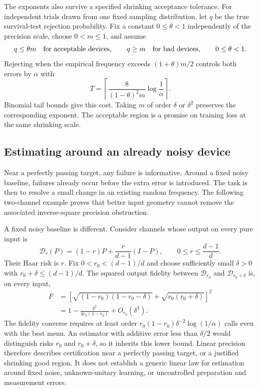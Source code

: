 \documentclass[11pt,a4paper]{article}
\numberwithin{equation}{section}
\begin{document}
The exponents also survive a specified shrinking acceptance tolerance. For independent trials drawn from one fixed sampling distribution, let $q$ be the true survival-test rejection probability. Fix a constant $0\le\theta<1$ independently of the precision scale, choose $0<m\le1$, and assume
\[
 q\le\theta m\quad\hbox{for acceptable devices},\qquad
 q\ge m\quad\hbox{for bad devices},\qquad 0\le\theta<1.
\]
Rejecting when the empirical frequency exceeds $(1+\theta)m/2$ controls both errors by $\alpha$ with
\[
 T=\left\lceil\frac{8}{(1-\theta)^2m}\log\frac1\alpha\right\rceil.
\]
Binomial tail bounds give this cost. Taking $m$ of order $\delta$ or $\delta^2$ preserves the corresponding exponent. The acceptable region is a promise on training loss at the same shrinking scale.

\subsection{Estimating around an already noisy device}
Near a perfectly passing target, any failure is informative. Around a fixed
noisy baseline, failures already occur before the extra error is introduced.
The task is then to resolve a small change in an existing random frequency.
The following two-channel example proves that better input geometry cannot
remove the associated inverse-square precision obstruction.

A fixed noisy baseline is different. Consider channels whose output on every pure input is
\[
 \mathcal D_r(P)=(1-r)P+\frac{r}{d-1}(I-P),
 \qquad 0\le r\le\frac{d-1}{d}.
\]
Their Haar risk is $r$. Fix $0<r_0<(d-1)/d$ and choose sufficiently small $\delta>0$ with $r_0+\delta\le(d-1)/d$. The squared output fidelity between $\mathcal D_{r_0}$ and $\mathcal D_{r_0+\delta}$ is, on every input,
\begin{align*}
 F&=\left[\sqrt{(1-r_0)(1-r_0-\delta)}
               +\sqrt{r_0(r_0+\delta)}\right]^2\\
  &=1-\frac{\delta^2}{4r_0(1-r_0)}+O_{r_0}(\delta^3).
\end{align*}
The fidelity converse requires at least order $r_0(1-r_0)\delta^{-2}\log(1/\alpha)$ calls even with the best menu. An estimator with additive error less than $\delta/2$ would distinguish risks $r_0$ and $r_0+\delta$, so it inherits this lower bound. Linear precision therefore describes certification near a perfectly passing target, or a justified shrinking good region. It does not establish a generic linear law for estimation around fixed noise, unknown-unitary learning, or uncontrolled preparation and measurement errors.
\end{document}
